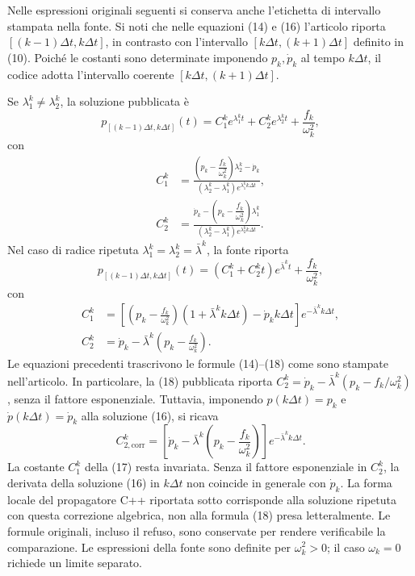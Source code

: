 Nelle espressioni originali seguenti si conserva anche l’etichetta di intervallo stampata nella fonte. Si noti che nelle equazioni (14) e (16) l’articolo riporta $[(k-1)\Delta t,k\Delta t]$, in contrasto con l’intervallo $[k\Delta t,(k+1)\Delta t]$ definito in (10). Poiché le costanti sono determinate imponendo $p_k,\dot p_k$ al tempo $k\Delta t$, il codice adotta l’intervallo coerente $[k\Delta t,(k+1)\Delta t]$.

Se $\lambda_1^k\ne\lambda_2^k$, la soluzione pubblicata è
\begin{equation}
 p_{[(k-1)\Delta t,k\Delta t]}(t)
 =C_1^k e^{\lambda_1^k t}
  +C_2^k e^{\lambda_2^k t}
  +\frac{f_k}{\omega_k^2},
 \label{eq:or-source-distinct}
\end{equation}
con
\begin{align}
 C_1^k&=
 \frac{\left(p_k-\dfrac{f_k}{\omega_k^2}\right)\lambda_2^k-\dot p_k}
 {\left(\lambda_2^k-\lambda_1^k\right)e^{\lambda_1^k k\Delta t}},
 \label{eq:or-source-c1-distinct}\\
 C_2^k&=
 \frac{\dot p_k-\left(p_k-\dfrac{f_k}{\omega_k^2}\right)\lambda_1^k}
 {\left(\lambda_2^k-\lambda_1^k\right)e^{\lambda_2^k k\Delta t}}.
 \label{eq:or-source-c2-distinct}
\end{align}
Nel caso di radice ripetuta $\lambda_1^k=\lambda_2^k=\bar\lambda^k$, la fonte riporta
\begin{equation}
 p_{[(k-1)\Delta t,k\Delta t]}(t)
 =\left(C_1^k+C_2^k t\right)e^{\bar\lambda^k t}
  +\frac{f_k}{\omega_k^2},
 \label{eq:or-source-repeated}
\end{equation}
con
\begin{align}
 C_1^k&=\left[
 \left(p_k-\frac{f_k}{\omega_k^2}\right)
 (1+\bar\lambda^k k\Delta t)-\dot p_k k\Delta t
 \right]e^{-\bar\lambda^k k\Delta t},
 \label{eq:or-source-c1-repeated}\\
 C_2^k&=\dot p_k-\bar\lambda^k
 \left(p_k-\frac{f_k}{\omega_k^2}\right).
 \label{eq:or-source-c2-repeated}
\end{align}
Le equazioni precedenti trascrivono le formule (14)--(18) come sono stampate nell'articolo. In particolare, la (18) pubblicata riporta $C_2^k=\dot p_k-\bar\lambda^k(p_k-f_k/\omega_k^2)$, senza il fattore esponenziale. Tuttavia, imponendo $p(k\Delta t)=p_k$ e $\dot p(k\Delta t)=\dot p_k$ alla soluzione (16), si ricava
\begin{equation}
 C_{2,\mathrm{corr}}^k=
 \left[\dot p_k-\bar\lambda^k\left(p_k-\frac{f_k}{\omega_k^2}\right)\right]
 e^{-\bar\lambda^k k\Delta t}.
 \label{eq:or-source-c2-repeated-corrected}
\end{equation}
La costante $C_1^k$ della (17) resta invariata. Senza il fattore esponenziale in $C_2^k$, la derivata della soluzione (16) in $k\Delta t$ non coincide in generale con $\dot p_k$. La forma locale del propagatore C++ riportata sotto corrisponde alla soluzione ripetuta con questa correzione algebrica, non alla formula (18) presa letteralmente. Le formule originali, incluso il refuso, sono conservate per rendere verificabile la comparazione. Le espressioni della fonte sono definite per $\omega_k^2>0$; il caso $\omega_k=0$ richiede un limite separato.

